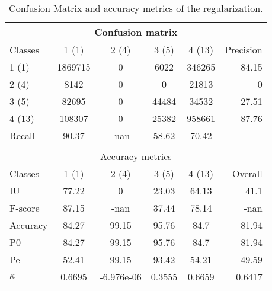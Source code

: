 \begin{table}
\begin{center}
\begin{tabular}{|l|c|c|c|c|r|}
\hline
\multicolumn{6}{|c|}{Confusion matrix} \\
\hline
 Classes & 1 (1) & 2 (4) & 3 (5) & 4 (13) & Precision \\
\hline
1 (1) & 1869715 & 0 & 6022 & 346265 & 84.15 \\
\hline
2 (4) & 8142 & 0 & 0 & 21813 & 0 \\
\hline
3 (5) & 82695 & 0 & 44484 & 34532 & 27.51 \\
\hline
4 (13) & 108307 & 0 & 25382 & 958661 & 87.76 \\
\hline
Recall & 90.37 & -nan & 58.62 & 70.42 &  \\
\hline
\multicolumn{6}{c}{ } \\
\hline
\multicolumn{6}{|c|}{Accuracy metrics} \\
\hline
 Classes & 1 (1) & 2 (4) & 3 (5) & 4 (13) & Overall \\
\hline
IU & 77.22 & 0 & 23.03 & 64.13 & 41.1 \\
\hline
F-score & 87.15 & -nan & 37.44 & 78.14 & -nan \\
\hline
Accuracy & 84.27 & 99.15 & 95.76 & 84.7 & 81.94 \\
\hline
P0 & 84.27 & 99.15 & 95.76 & 84.7 & 81.94 \\
\hline
Pe & 52.41 & 99.15 & 93.42 & 54.21 & 49.59 \\
\hline
$\kappa$ & 0.6695 & -6.976e-06 & 0.3555 & 0.6659 & 0.6417 \\
\hline
\end{tabular}
\caption{Confusion Matrix and accuracy metrics of the regularization.}
\end{center}
\end{table}